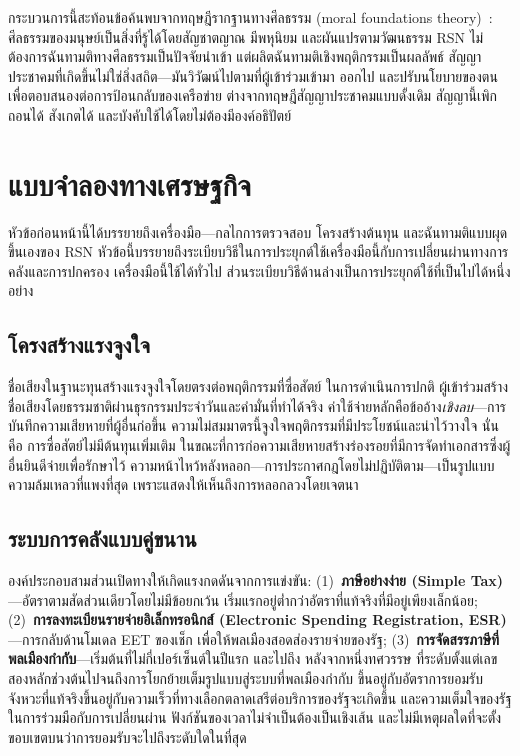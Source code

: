 \documentclass[11pt,a4paper,twocolumn]{article}
\begin{document}
กระบวนการนี้สะท้อนข้อค้นพบจากทฤษฎีรากฐานทางศีลธรรม (moral foundations theory)~\cite{haidt2012}: ศีลธรรมของมนุษย์เป็นสิ่งที่รู้ได้โดยสัญชาตญาณ มีพหุนิยม และผันแปรตามวัฒนธรรม RSN ไม่ต้องการฉันทามติทางศีลธรรมเป็นปัจจัยนำเข้า แต่ผลิตฉันทามติเชิงพฤติกรรมเป็นผลลัพธ์ สัญญาประชาคมที่เกิดขึ้นไม่ใช่สิ่งสถิต---มันวิวัฒน์ไปตามที่ผู้เข้าร่วมเข้ามา ออกไป และปรับนโยบายของตนเพื่อตอบสนองต่อการป้อนกลับของเครือข่าย ต่างจากทฤษฎีสัญญาประชาคมแบบดั้งเดิม สัญญานี้เพิกถอนได้ สังเกตได้ และบังคับใช้ได้โดยไม่ต้องมีองค์อธิปัตย์

\section{แบบจำลองทางเศรษฐกิจ}

หัวข้อก่อนหน้านี้ได้บรรยายถึงเครื่องมือ---กลไกการตรวจสอบ โครงสร้างต้นทุน และฉันทามติแบบผุดขึ้นเองของ RSN หัวข้อนี้บรรยายถึงระเบียบวิธีในการประยุกต์ใช้เครื่องมือนี้กับการเปลี่ยนผ่านทางการคลังและการปกครอง เครื่องมือนี้ใช้ได้ทั่วไป ส่วนระเบียบวิธีด้านล่างเป็นการประยุกต์ใช้ที่เป็นไปได้หนึ่งอย่าง

\subsection{โครงสร้างแรงจูงใจ}

ชื่อเสียงในฐานะทุนสร้างแรงจูงใจโดยตรงต่อพฤติกรรมที่ซื่อสัตย์ ในการดำเนินการปกติ ผู้เข้าร่วมสร้างชื่อเสียงโดยธรรมชาติผ่านธุรกรรมประจำวันและคำมั่นที่ทำได้จริง ค่าใช้จ่ายหลักคือข้ออ้าง\emph{เชิงลบ}---การบันทึกความเสียหายที่ผู้อื่นก่อขึ้น ความไม่สมมาตรนี้จูงใจพฤติกรรมที่มีประโยชน์และน่าไว้วางใจ นั่นคือ การซื่อสัตย์ไม่มีต้นทุนเพิ่มเติม ในขณะที่การก่อความเสียหายสร้างร่องรอยที่มีการจัดทำเอกสารซึ่งผู้อื่นยินดีจ่ายเพื่อรักษาไว้ ความหน้าไหว้หลังหลอก---การประกาศกฎโดยไม่ปฏิบัติตาม---เป็นรูปแบบความล้มเหลวที่แพงที่สุด เพราะแสดงให้เห็นถึงการหลอกลวงโดยเจตนา

\subsection{ระบบการคลังแบบคู่ขนาน}

องค์ประกอบสามส่วนเปิดทางให้เกิดแรงกดดันจากการแข่งขัน: (1)~\textbf{ภาษีอย่างง่าย (Simple Tax)}---อัตราตามสัดส่วนเดียวโดยไม่มีข้อยกเว้น เริ่มแรกอยู่ต่ำกว่าอัตราที่แท้จริงที่มีอยู่เพียงเล็กน้อย; (2)~\textbf{การลงทะเบียนรายจ่ายอิเล็กทรอนิกส์ (Electronic Spending Registration, ESR)}---การกลับด้านโมเดล EET ของเช็ก เพื่อให้พลเมืองสอดส่องรายจ่ายของรัฐ; (3)~\textbf{การจัดสรรภาษีที่พลเมืองกำกับ}---เริ่มต้นที่ไม่กี่เปอร์เซ็นต์ในปีแรก และไปถึง หลังจากหนึ่งทศวรรษ ที่ระดับตั้งแต่เลขสองหลักช่วงต้นไปจนถึงการโยกย้ายเต็มรูปแบบสู่ระบบที่พลเมืองกำกับ ขึ้นอยู่กับอัตราการยอมรับ จังหวะที่แท้จริงขึ้นอยู่กับความเร็วที่ทางเลือกตลาดเสรีต่อบริการของรัฐจะเกิดขึ้น และความเต็มใจของรัฐในการร่วมมือกับการเปลี่ยนผ่าน ฟังก์ชันของเวลาไม่จำเป็นต้องเป็นเชิงเส้น และไม่มีเหตุผลใดที่จะตั้งขอบเขตบนว่าการยอมรับจะไปถึงระดับใดในที่สุด
\end{document}
